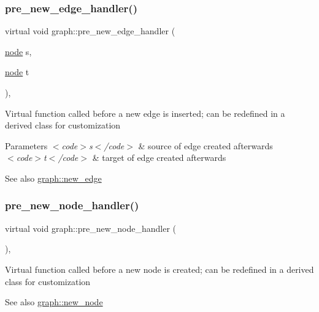 \subsubsection{\texorpdfstring{pre\+\_\+new\+\_\+edge\+\_\+handler()}{pre\_new\_edge\_handler()}}
{\footnotesize\ttfamily virtual void graph\+::pre\+\_\+new\+\_\+edge\+\_\+handler (\begin{DoxyParamCaption}\item[{\mbox{\hyperlink{classnode}{node}}}]{s,  }\item[{\mbox{\hyperlink{classnode}{node}}}]{t }\end{DoxyParamCaption})\hspace{0.3cm}{\ttfamily [inline]}, {\ttfamily [virtual]}}

Virtual function called before a new edge is inserted; can be redefined in a derived class for customization


\begin{DoxyParams}{Parameters}
{\em $<$code$>$s$<$/code$>$} & source of edge created afterwards \\
\hline
{\em $<$code$>$t$<$/code$>$} & target of edge created afterwards \\
\hline
\end{DoxyParams}
\begin{DoxySeeAlso}{See also}
\mbox{\hyperlink{classgraph_a02a0c3a219f75d68caa408ef339d4a1c}{graph\+::new\+\_\+edge}} 
\end{DoxySeeAlso}
\mbox{\label{classgraph_afb7606eaa8d673b6599af24437c0546c}} 
\subsubsection{\texorpdfstring{pre\+\_\+new\+\_\+node\+\_\+handler()}{pre\_new\_node\_handler()}}
{\footnotesize\ttfamily virtual void graph\+::pre\+\_\+new\+\_\+node\+\_\+handler (\begin{DoxyParamCaption}{ }\end{DoxyParamCaption})\hspace{0.3cm}{\ttfamily [inline]}, {\ttfamily [virtual]}}

Virtual function called before a new node is created; can be redefined in a derived class for customization

\begin{DoxySeeAlso}{See also}
\mbox{\hyperlink{classgraph_ab9505335c20558319b6cce25aed23524}{graph\+::new\+\_\+node}} 
\end{DoxySeeAlso}
\mbox{\label{classgraph_a4c3634093c7d8877b6c229bcbfa4702b}} 
